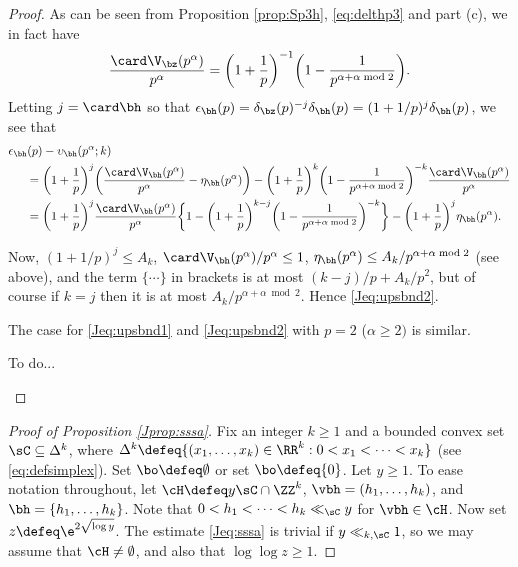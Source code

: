 \documentclass[12pt, reqno, twoside, letterpaper]{amsart}
\begin{document}
\begin{jetsam}
\begin{proof}
As can be seen from Proposition \ref{prop:Sp3h}, 
\eqref{eq:delthp3} and part (c), we in fact have
\[
 \frac{\card \V_{\bz}(p^{\alpha})}{p^{\alpha}}
  =
   \bigg(1 + \frac{1}{p}\bigg)^{-1}
    \bigg(1 - \frac{1}{p^{\alpha + \alpha \bmod 2}}\bigg).
\]
%
Letting $j = \card \bh$ so that 
$
 \epsilon_{\bh}(p) 
  = \delta_{\bz}(p)^{-j}\delta_{\bh}(p)
  = (1 + 1/p)^{j}\delta_{\bh}(p)
$, 
we see that
{\small 
\begin{align*}
 & 
 \epsilon_{\bh}(p) - \upsilon_{\bh}(p^{\alpha};k)
  \\ 
 & \hspace{15pt}
  =   
    \bigg(1 + \frac{1}{p}\bigg)^{j}
     \bigg(\frac{\card \V_{\bh}(p^{\alpha})}{p^{\alpha}} - \eta_{\bh}(p^{\alpha})\bigg)
      -
       \bigg(1 + \frac{1}{p}\bigg)^{k}
        \bigg(1 - \frac{1}{p^{\alpha + \alpha \bmod 2}}\bigg)^{-k}
         \frac{\card \V_{\bh}(p^{\alpha})}{p^{\alpha}}
  \\
 & \hspace{15pt}
  =   
   \bigg(1 + \frac{1}{p}\bigg)^{j}
    \frac{\card \V_{\bh}(p^{\alpha})}{p^{\alpha}}
     \bigg\{1 - \bigg(1 + \frac{1}{p}\bigg)^{k - j}\bigg(1 - \frac{1}{p^{\alpha + \alpha \bmod 2}}\bigg)^{-k}\bigg\}
      - \bigg(1 + \frac{1}{p}\bigg)^{j}\eta_{\bh}(p^{\alpha}). 
\end{align*}
}

\noindent 
Now, $(1 + 1/p)^{j} \le A_k$, 
$\card \V_{\bh}(p^{\alpha})/p^{\alpha} \le 1$, 
$\eta_{\bh}(p^{\alpha}) \le A_k/p^{\alpha + \alpha \bmod 2}$ (see 
above), and the term $\{\cdots\}$ in brackets is at most 
$(k - j)/p + A_k/p^2$, but of course if $k = j$ 
then it is at most $A_k/p^{\alpha + \alpha \bmod 2}$.
%
Hence \eqref{Jeq:upsbnd2}.

The case for \eqref{Jeq:upsbnd1} and \eqref{Jeq:upsbnd2} with 
$p = 2$ ($\alpha \ge 2)$ is similar.
%
%
\begin{nixnix}
%
To do...
\end{nixnix}
%
%
\end{proof}

\begin{proof}[Proof of Proposition \ref{Jprop:sssa}]
%
Fix an integer $k \ge 1$ and a bounded convex set 
$\sC \subseteq \Delta^k$, where 
$
 \Delta^k \defeq \{(x_1,\ldots,x_k) \in \RR^k : 0 < x_1 < \cdots < x_k\}
$ 
(see \eqref{eq:defsimplex}). 
%
Set $\bo \defeq \emptyset$ or set $\bo \defeq \{0\}$.
%
Let $y \ge 1$.
%
To ease notation throughout, let $\cH \defeq y\sC \cap \ZZ^k$, 
$\vbh = (h_1,\ldots,h_k)$, and $\bh = \{h_1,\ldots,h_k\}$.
%
Note that $0 < h_1 < \cdots < h_k \ll_{\sC} y$ for $\vbh \in \cH$.
%
Now set $z \defeq \e^{2\sqrt{\log y}}$.
%
The estimate \eqref{Jeq:sssa} is trivial if $y \ll_{k,\sC} 1$, so 
we may assume that $\cH \ne \emptyset$, and also that 
$\log\log z \ge 1$.


\end{proof}
\end{jetsam}
\end{document}
